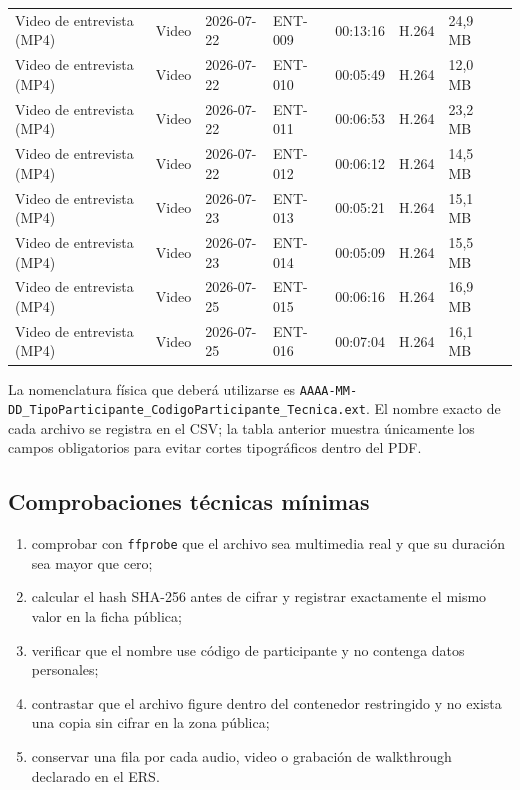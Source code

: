 \documentclass[12pt,a4paper]{article}
\begin{document}
\begin{landscape}
\begin{longtable}{L{3.35cm} L{1.35cm} L{1.90cm} L{1.55cm} L{1.65cm} L{1.45cm} L{1.75cm} L{6.50cm}}
Video de entrevista (MP4) & Video & 2026-07-22 & ENT-009 & 00:13:16 & H.264 & 24,9 MB & \\
Video de entrevista (MP4) & Video & 2026-07-22 & ENT-010 & 00:05:49 & H.264 & 12,0 MB & \\
Video de entrevista (MP4) & Video & 2026-07-22 & ENT-011 & 00:06:53 & H.264 & 23,2 MB & \\
Video de entrevista (MP4) & Video & 2026-07-22 & ENT-012 & 00:06:12 & H.264 & 14,5 MB & \\
Video de entrevista (MP4) & Video & 2026-07-23 & ENT-013 & 00:05:21 & H.264 & 15,1 MB & \\
Video de entrevista (MP4) & Video & 2026-07-23 & ENT-014 & 00:05:09 & H.264 & 15,5 MB & \\
Video de entrevista (MP4) & Video & 2026-07-25 & ENT-015 & 00:06:16 & H.264 & 16,9 MB & \\
Video de entrevista (MP4) & Video & 2026-07-25 & ENT-016 & 00:07:04 & H.264 & 16,1 MB & \\
\end{longtable}
\end{landscape}

La nomenclatura física que deberá utilizarse es \nolinkurl{AAAA-MM-DD_TipoParticipante_CodigoParticipante_Tecnica.ext}. El nombre exacto de cada archivo se registra en el CSV; la tabla anterior muestra únicamente los campos obligatorios para evitar cortes tipográficos dentro del PDF.

\subsection{Comprobaciones técnicas mínimas}

\begin{enumerate}
  \item comprobar con \texttt{ffprobe} que el archivo sea multimedia real y que su duración sea mayor que cero;
  \item calcular el hash SHA-256 antes de cifrar y registrar exactamente el mismo valor en la ficha pública;
  \item verificar que el nombre use código de participante y no contenga datos personales;
  \item contrastar que el archivo figure dentro del contenedor restringido y no exista una copia sin cifrar en la zona pública;
  \item conservar una fila por cada audio, video o grabación de walkthrough declarado en el ERS.
\end{enumerate}
\end{document}
